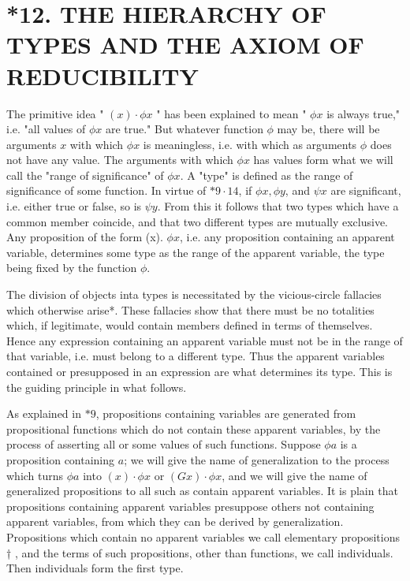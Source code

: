 \documentclass[10pt]{article}
\begin{document}
\section*{*12. THE HIERARCHY OF TYPES AND THE AXIOM OF REDUCIBILITY}
The primitive idea " $(x) \cdot \phi x$ " has been explained to mean " $\phi x$ is always true," i.e. "all values of $\phi x$ are true." But whatever function $\phi$ may be, there will be arguments $x$ with which $\phi x$ is meaningless, i.e. with which as arguments $\phi$ does not have any value. The arguments with which $\phi x$ has values form what we will call the "range of significance" of $\phi x$. A "type" is defined as the range of significance of some function. In virtue of $* 9 \cdot 14$, if $\phi x, \phi y$, and $\psi x$ are significant, i.e. either true or false, so is $\psi y$. From this it follows that two types which have a common member coincide, and that two different types are mutually exclusive. Any proposition of the form (x). $\phi x$, i.e. any proposition containing an apparent variable, determines some type as the range of the apparent variable, the type being fixed by the function $\phi$.

The division of objects inta types is necessitated by the vicious-circle fallacies which otherwise arise*. These fallacies show that there must be no totalities which, if legitimate, would contain members defined in terms of themselves. Hence any expression containing an apparent variable must not be in the range of that variable, i.e. must belong to a different type. Thus the apparent variables contained or presupposed in an expression are what determines its type. This is the guiding principle in what follows.

As explained in $* 9$, propositions containing variables are generated from propositional functions which do not contain these apparent variables, by the process of asserting all or some values of such functions. Suppose $\phi a$ is a proposition containing $a$; we will give the name of generalization to the process which turns $\phi a$ into $(x) \cdot \phi x$ or $(G x) \cdot \phi x$, and we will give the name of generalized propositions to all such as contain apparent variables. It is plain that propositions containing apparent variables presuppose others not containing apparent variables, from which they can be derived by generalization. Propositions which contain no apparent variables we call elementary propositions † , and the terms of such propositions, other than functions, we call individuals. Then individuals form the first type.
\end{document}

